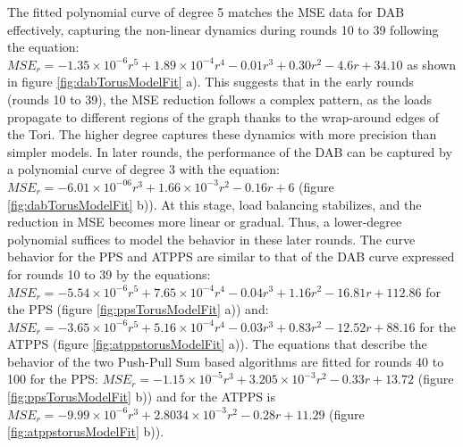 The fitted polynomial curve of degree 5 matches the MSE data for DAB effectively, capturing the non-linear dynamics during rounds 10 to 39 following the equation: $MSE_r=-1.35\times 10^{-6}r^{5}+ 1.89\times 10^{-4}r^{4}-0.01r^{3}+0.30r^{2}-4.6r+34.10$ as shown in figure \ref{fig:dabTorusModelFit} a). This suggests that in the early rounds (rounds 10 to 39), the MSE reduction follows a complex pattern, as the loads propagate to different regions of the graph thanks to the wrap-around edges of the Tori. The higher degree captures these dynamics with more precision than simpler models. In later rounds, the performance of the DAB can be captured by a polynomial curve of degree 3 with the equation: $MSE_r=-6.01\times 10^{-06}r^{3}+1.66\times 10^{-3}r^{2}-0.16r+6$ (figure \ref{fig:dabTorusModelFit} b)). At this stage, load balancing stabilizes, and the reduction in MSE becomes more linear or gradual. Thus, a lower-degree polynomial suffices to model the behavior in these later rounds. The curve behavior for the PPS and ATPPS are similar to that of the DAB curve expressed for rounds 10 to 39 by the equations: $MSE_r=-5.54\times 10^{-6}r^{5}+7.65\times 10^{-4}r^{4}-0.04r^{3}+1.16r^{2}-16.81r+112.86$ for the PPS (figure \ref{fig:ppsTorusModelFit} a)) and: $MSE_r = -3.65 \times 10^{-6}r^{5} + 5.16 \times 10^{-4}r^{4} - 0.03r^{3} + 0.83r^{2} - 12.52r + 88.16$ for the ATPPS (figure \ref{fig:atppstorusModelFit} a)). The equations that describe the behavior of the two Push-Pull Sum based algorithms are fitted for rounds 40 to 100 for the PPS: $MSE_r = -1.15 \times 10^{-5}r^{3} + 3.205\times 10^{-3}r^{2} - 0.33r + 13.72$ (figure \ref{fig:ppsTorusModelFit} b)) and for the ATPPS is $MSE_r = -9.99 \times 10^{-6}r^{3} + 2.8034\times 10^{-3}r^{2} - 0.28r + 11.29$ (figure \ref{fig:atppstorusModelFit} b)).

